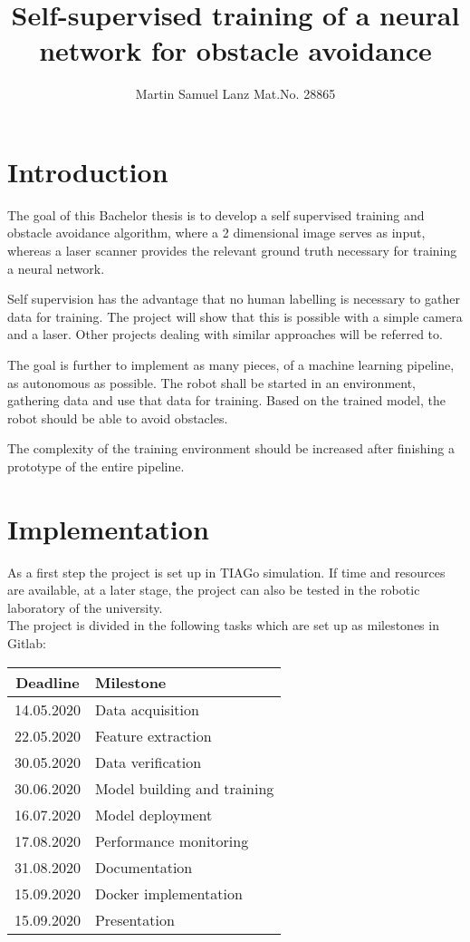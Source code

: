 \documentclass[a4paper,11pt,singlespacing]{article}
\title{Self-supervised training of a neural network for obstacle avoidance}
\author{
	Martin Samuel Lanz Mat.No. 28865
	}
\begin{document}
\setlength{\parindent}{0ex}


\maketitle

\pagebreak

\tableofcontents
\pagebreak



\section{Introduction}
The goal of this Bachelor thesis is to develop a self supervised training and obstacle avoidance algorithm, where a 2 dimensional image serves as input, whereas a laser scanner provides the relevant ground truth necessary for training a neural network.

Self supervision has the advantage that no human labelling is necessary to gather data for training. The project will show that this is possible with a simple camera and a laser. Other projects dealing with similar approaches will be referred to. 

The goal is further to implement as many pieces, of a machine learning pipeline, as autonomous as possible. The robot shall be started in an environment, gathering data and use that data for training. Based on the trained model, the robot should be able to avoid obstacles.

The complexity of the training environment should be increased after finishing a prototype of the entire pipeline.

\newpage
\section{Implementation}
As a first step the project is set up in TIAGo simulation. If time and resources are available, at a later stage, the project can also be tested in the robotic laboratory of the university.\\

The project is divided in the following tasks which are set up as milestones in Gitlab:

\begin{center}
\begin{tabular}{|c|l|}
 Deadline & Milestone\\ [0.5ex]
\hline
 14.05.2020 & Data acquisition\\ 
 22.05.2020 & Feature extraction\\  
 30.05.2020 & Data verification\\
 30.06.2020 & Model building and training\\
 16.07.2020 & Model deployment\\
 17.08.2020 & Performance monitoring\\
 31.08.2020 & Documentation\\
 15.09.2020 & Docker implementation\\
 15.09.2020 & Presentation
\end{tabular}
\end{center}
\end{document}
